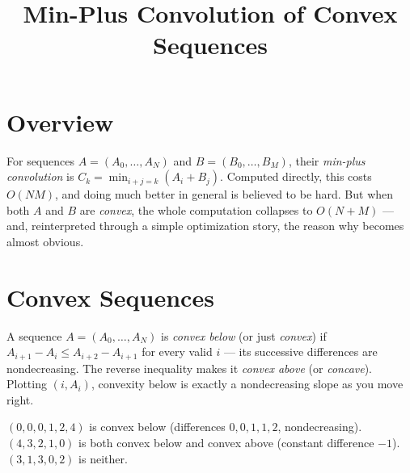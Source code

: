 \documentclass[11pt]{article}
\title{Min-Plus Convolution of Convex Sequences}
\author{}
\date{}
\begin{document}
\thispagestyle{fancy}


\section{Overview}
For sequences $A=(A_0,\ldots,A_N)$ and $B=(B_0,\ldots,B_M)$, their
\emph{min-plus convolution} is $C_k = \min_{i+j=k}(A_i+B_j)$. Computed
directly, this costs $O(NM)$, and doing much better in general is
believed to be hard. But when both $A$ and $B$ are \emph{convex}, the
whole computation collapses to $O(N+M)$ --- and, reinterpreted through a
simple optimization story, the reason why becomes almost obvious.

\section{Convex Sequences}
\begin{definitionbox}
A sequence $A=(A_0,\ldots,A_N)$ is \emph{convex below} (or just
\emph{convex}) if $A_{i+1}-A_i \le A_{i+2}-A_{i+1}$ for every valid $i$
--- its successive differences are nondecreasing. The reverse inequality
makes it \emph{convex above} (or \emph{concave}). Plotting $(i, A_i)$,
convexity below is exactly a nondecreasing slope as you move right.
\end{definitionbox}

\begin{examplebox}
$(0,0,0,1,2,4)$ is convex below (differences $0,0,1,1,2$, nondecreasing).
$(4,3,2,1,0)$ is both convex below and convex above (constant
difference $-1$). $(3,1,3,0,2)$ is neither.
\end{examplebox}
\end{document}
